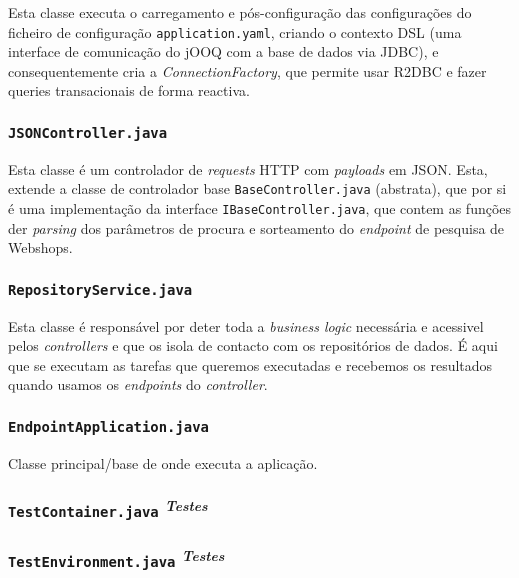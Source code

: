 Esta classe executa o carregamento e pós-configuração das configurações do ficheiro de configuração \texttt{application.yaml}, criando o contexto DSL (uma interface de comunicação do jOOQ com a base de dados via JDBC), e consequentemente cria a \textit{ConnectionFactory}, que permite usar R2DBC e fazer queries transacionais de forma reactiva.

\subsubsection*{\texttt{JSONController.java}}

Esta classe é um controlador de \textit{requests} HTTP com \textit{payloads} em JSON. Esta, extende a classe de controlador base \texttt{BaseController.java} (abstrata), que por si é uma implementação da interface \texttt{IBaseController.java}, que contem as funções der \textit{parsing} dos parâmetros de procura e sorteamento do \textit{endpoint} de pesquisa de Webshops.

\subsubsection*{\texttt{RepositoryService.java}}

Esta classe é responsável por deter toda a \textit{business logic} necessária e acessivel pelos \textit{controllers} e que os isola de contacto com os repositórios de dados. É aqui que se executam as tarefas que queremos executadas e recebemos os resultados quando usamos os \textit{endpoints} do \textit{controller}.

\newpage

\subsubsection*{\texttt{EndpointApplication.java}}

Classe principal/base de onde executa a aplicação.

\subsubsection*{\texttt{TestContainer.java} \textsuperscript{\textit{Testes}}}

\subsubsection*{\texttt{TestEnvironment.java} \textsuperscript{\textit{Testes}}}

